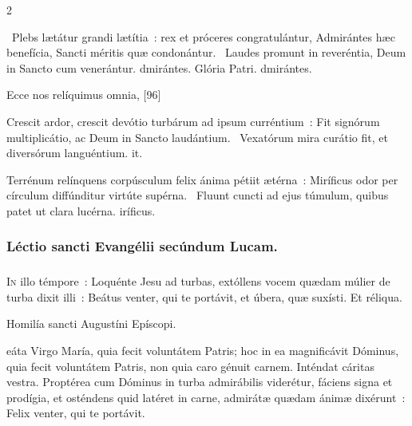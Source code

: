 \documentclass[9pt,twoside]{extarticle}
\begin{document}
\begin{multicols}{2}
{{\begin{tightlist}{}
\item {}~Plebs lætátur grandi lætítia~: rex et próceres congratulántur, \textred{*} Admirántes hæc benefícia, Sancti méritis quæ condonántur.
~Laudes promunt in reveréntia, Deum in Sancto cum venerántur. dmirántes. Glória Patri. dmirántes.
\item {} Ecce nos relíquimus omnia,  [96]
\item {} Crescit ardor, crescit devótio turbárum ad ipsum curréntium~: \textred{*} Fit signórum multiplicátio, ac Deum in Sancto laudántium.
~Vexatórum mira curátio fit, et diversórum languéntium. it.
\item {} Terrénum relínquens corpúsculum felix ánima pétiit ætérna~: \textred{*} Miríficus odor per círculum diffúnditur virtúte supérna.
~Fluunt cuncti ad ejus túmulum, quibus patet ut clara lucérna. iríficus.
\item {}
\end{tightlist}

\subsubsection*{\center Léctio sancti Evangélii secúndum Lucam.}
\subsubsection*{\center {}}
\lettrine{I}n illo témpore~: Loquénte Jesu ad turbas, extóllens vocem quædam múlier de turba dixit illi~: Beátus venter, qui te portávit, et úbera, quæ suxísti. Et réliqua.

\begin{center}Homilía sancti Augustíni Epíscopi.\\
\end{center}
eáta Virgo María, quia fecit voluntátem Patris; hoc in ea magnificávit Dóminus, quia fecit voluntátem Patris, non quia caro génuit carnem. Inténdat cáritas vestra. Proptérea cum Dóminus in turba admirábilis viderétur, fáciens signa et prodígia, et osténdens quid latéret in carne, admirátæ quædam ánimæ dixérunt~: Felix venter, qui te portávit.

}}
\end{multicols}
\end{document}
